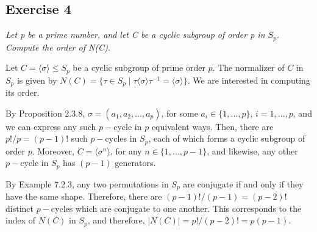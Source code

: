 \subsection*{Exercise 4}
\textit{Let p be a prime number, and let C be a cyclic subgroup of order p in $S_p$. Compute the order of N(C).}

\vspace{5 mm}
Let $C = \langle \sigma \rangle \le S_p$ be a cyclic subgroup of prime order $p$. The normalizer of $C$ in $S_p$ is given by $N(C) = \{\tau \in S_p \mid \tau\langle \sigma \rangle\tau^{-1} = \langle \sigma \rangle\}$. We are interested in computing its order.

By Proposition 2.3.8, $\sigma = (a_1,a_2,...,a_p)$, for some $a_i \in \{1,...,p\}$, $i = 1,...,p$, and we can express any such $p-$cycle in $p$ equivalent ways. Then, there are $p!/p = (p-1)!$ such $p-$cycles in $S_p$, each of which forms a cyclic subgroup of order $p$. Moreover, $C = \langle \sigma^n \rangle$, for any $n \in \{1,...,p-1\}$, and likewise, any other $p-$cycle in $S_p$ has $(p-1)$ generators.

By Example 7.2.3, any two permutations in $S_p$ are conjugate if and only if they have the same shape. Therefore, there are $(p-1)!/(p-1) = (p-2)!$ distinct $p-$cycles which are conjugate to one another. This corresponds to the index of $N(C)$ in $S_p$, and therefore, $|N(C)| = p!/(p-2)! = p(p-1)$.